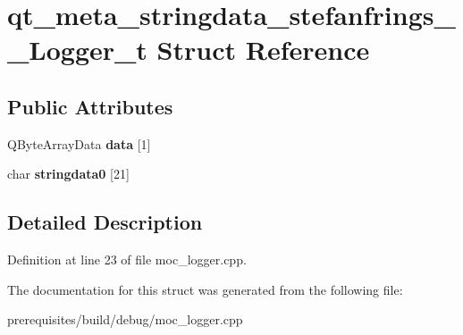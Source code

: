 \hypertarget{structqt__meta__stringdata__stefanfrings_____logger__t}{}\section{qt\+\_\+meta\+\_\+stringdata\+\_\+stefanfrings\+\_\+\+\_\+\+Logger\+\_\+t Struct Reference}
\label{structqt__meta__stringdata__stefanfrings_____logger__t}
\subsection*{Public Attributes}
\begin{DoxyCompactItemize}
\item 
\mbox{\label{structqt__meta__stringdata__stefanfrings_____logger__t_aa7572108350d712f5db7191270d5d207}} 
Q\+Byte\+Array\+Data {\bfseries data} \mbox{[}1\mbox{]}
\item 
\mbox{\label{structqt__meta__stringdata__stefanfrings_____logger__t_ac962678f25f7b85851d257ee82f075c4}} 
char {\bfseries stringdata0} \mbox{[}21\mbox{]}
\end{DoxyCompactItemize}


\subsection{Detailed Description}


Definition at line 23 of file moc\+\_\+logger.\+cpp.



The documentation for this struct was generated from the following file\+:\begin{DoxyCompactItemize}
\item 
prerequisites/build/debug/moc\+\_\+logger.\+cpp\end{DoxyCompactItemize}
